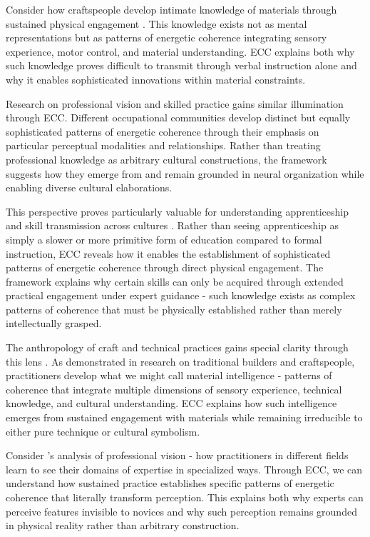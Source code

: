 \begin{refsection}
Consider how craftspeople develop intimate knowledge of materials through sustained physical engagement \cite{bunn1999nomads,marchand2010making}. This knowledge exists not as mental representations but as patterns of energetic coherence integrating sensory experience, motor control, and material understanding. ECC explains both why such knowledge proves difficult to transmit through verbal instruction alone and why it enables sophisticated innovations within material constraints.

Research on professional vision and skilled practice \cite{goodwin1994professional} gains similar illumination through ECC. Different occupational communities develop distinct but equally sophisticated patterns of energetic coherence through their emphasis on particular perceptual modalities and relationships. Rather than treating professional knowledge as arbitrary cultural constructions, the framework suggests how they emerge from and remain grounded in neural organization while enabling diverse cultural elaborations.

This perspective proves particularly valuable for understanding apprenticeship and skill transmission across cultures \cite{marchand2010making}. Rather than seeing apprenticeship as simply a slower or more primitive form of education compared to formal instruction, ECC reveals how it enables the establishment of sophisticated patterns of energetic coherence through direct physical engagement. The framework explains why certain skills can only be acquired through extended practical engagement under expert guidance - such knowledge exists as complex patterns of coherence that must be physically established rather than merely intellectually grasped.

The anthropology of craft and technical practices gains special clarity through this lens \cite{bunn1999nomads}. As demonstrated in research on traditional builders and craftspeople, practitioners develop what we might call material intelligence - patterns of coherence that integrate multiple dimensions of sensory experience, technical knowledge, and cultural understanding. ECC explains how such intelligence emerges from sustained engagement with materials while remaining irreducible to either pure technique or cultural symbolism.

Consider \cite{goodwin1994professional}'s analysis of professional vision - how practitioners in different fields learn to see their domains of expertise in specialized ways. Through ECC, we can understand how sustained practice establishes specific patterns of energetic coherence that literally transform perception. This explains both why experts can perceive features invisible to novices and why such perception remains grounded in physical reality rather than arbitrary construction.


\end{refsection}
